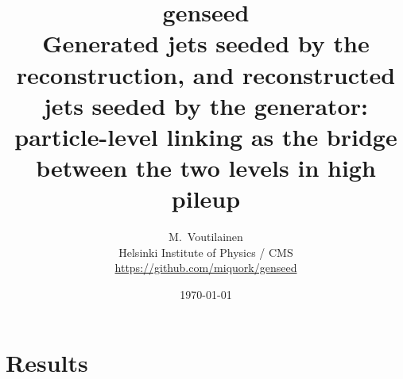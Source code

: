 \documentclass[11pt,a4paper]{article}
\title{genseed\\ \large Generated jets seeded by the reconstruction, and reconstructed jets seeded by the generator:\\
particle-level linking as the bridge between the two levels in high pileup}
\author{M.~Voutilainen \\ \small Helsinki Institute of Physics / CMS \\ \small \url{https://github.com/miquork/genseed}}
\date{\today}
\begin{document}
\maketitle

\begin{abstract}
\noindent

\end{abstract}

\tableofcontents



\section{Results}
\label{s:results}




\end{document}
